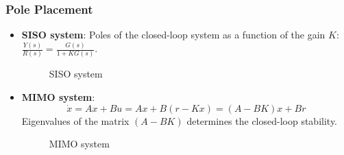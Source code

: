 \subsubsection{Pole Placement}
\begin{itemize}
\item \textbf{SISO system}: Poles of the closed-loop system as a function of the gain $K$: $\displaystyle \frac{Y(s)}{R(s)} = \frac{G(s)}{1+KG(s)}$.
\begin{figure}[H] 
    \centering
    
    \caption{SISO system}
\end{figure}
\item \textbf{MIMO system}: 
\[\dot{x} = Ax+Bu = Ax +B(r-Kx) = (A-BK)x+Br\]
Eigenvalues of the matrix $(A-BK)$ determines the closed-loop stability.

\begin{figure}[H] 
    \centering
    
    \caption{MIMO system}
\end{figure}
\end{itemize}
